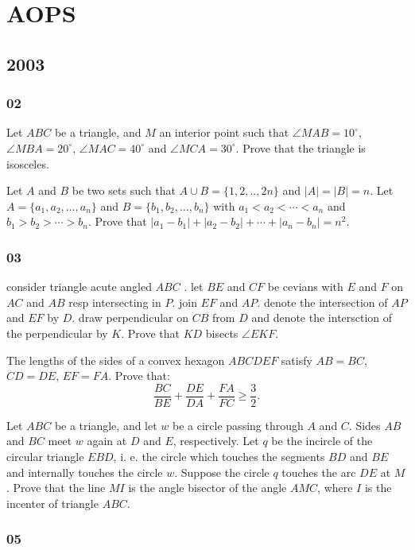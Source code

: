 \chapter{AOPS}
\section{2003}
\subsection{02}

Let $ABC$ be a triangle, and $M$ an interior point such that $\angle MAB=10^\circ$, $\angle MBA=20^\circ$, $\angle MAC=40^\circ$ and $\angle MCA=30^\circ$. Prove that the triangle is isosceles.
\eq

Let $A$ and $B$ be two sets such that $A \cup B = \{1,2,..,2n\}$ and $|A|=|B|=n$. Let $A = \{a_1,a_2,\ldots,a_n\}$ and $B=\{b_1,b_2,\ldots,b_n\}$ with $a_1<a_2<\cdots <a_n$ and $b_1>b_2>\cdots>b_n$. Prove that $|a_1-b_1| + |a_2-b_2| + \cdots + |a_n-b_n|=n^2$.
\eq

\newpage
\subsection{03}
consider triangle acute angled $ABC$ . let $BE$ and $CF$ be cevians with $E$ and $F$ on
$AC$ and $AB$ resp intersecting in $P$. join $EF$ and $AP$. denote the intersection of $AP$ and $EF$ by $D$. draw perpendicular on $CB$ from $D$ and denote the intersction of the perpendicular by $K$. Prove that $KD$ bisects $\angle EKF$.
\eq

The lengths of the sides of a convex hexagon $ ABCDEF$ satisfy $ AB = BC$, $ CD = DE$, $ EF = FA$. Prove that:
\[ \frac {BC}{BE} + \frac {DE}{DA} + \frac {FA}{FC} \geq \frac {3}{2}. \]
\eq

Let $ABC$ be a triangle, and let $w$ be a circle passing through $A$ and $C$. Sides $AB$ and $BC$ meet $w$ again at $D$ and $E$, respectively. Let $q$ be the incircle of the circular triangle $EBD$, i. e. the circle which touches the segments $BD$ and $BE$ and internally touches the circle $w$. Suppose the circle $q$ touches the arc $DE$ at $M$. Prove that the line $MI$ is the angle bisector of the angle $AMC$, where $I$ is the incenter of triangle $ABC$.
\eq

\newpage
\subsection{05}

